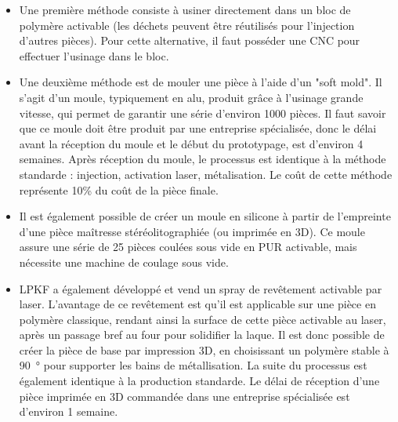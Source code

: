 \begin{itemize}
    \item Une première méthode consiste à usiner directement dans un bloc de polymère activable (les déchets peuvent être réutilisés pour l'injection
        d'autres pièces). Pour cette alternative, il faut posséder une CNC pour effectuer l'usinage dans le bloc.


    \item Une deuxième méthode est de mouler une pièce à l'aide d'un "soft mold". Il s'agit d'un moule, typiquement en alu, produit grâce à l'usinage
        grande vitesse, qui permet de garantir une série d'environ 1000 pièces. Il faut savoir que ce moule doit être produit par une entreprise spécialisée, donc
        le délai avant la réception du moule et le début du prototypage, est d'environ 4 semaines. Après réception du moule, le processus est identique à la méthode
        standarde : injection, activation laser, métalisation. Le coût de cette méthode représente 10\% du coût de la pièce finale.

    \item Il est également possible de créer un moule en silicone à partir de l'empreinte d'une pièce maîtresse stéréolitographiée (ou imprimée en 3D). Ce moule assure 
        une série de 25 pièces coulées sous vide en PUR activable, mais nécessite une machine de coulage sous vide. 

    \item LPKF a également développé et vend un spray de revêtement activable par laser. L'avantage de ce revêtement est qu'il est applicable sur une pièce en polymère
        classique, rendant ainsi la surface de cette pièce activable au laser, après un passage bref au four pour solidifier la laque. 
        Il est donc possible de créer la pièce de base par impression 3D, en choisissant un polymère stable à \SI{90}{\degree} pour supporter les bains de métallisation. La suite du 
        processus est également identique à la production standarde. Le délai de réception d'une pièce imprimée en 3D commandée dans une entreprise spécialisée
        est d'environ 1 semaine.
\end{itemize}









